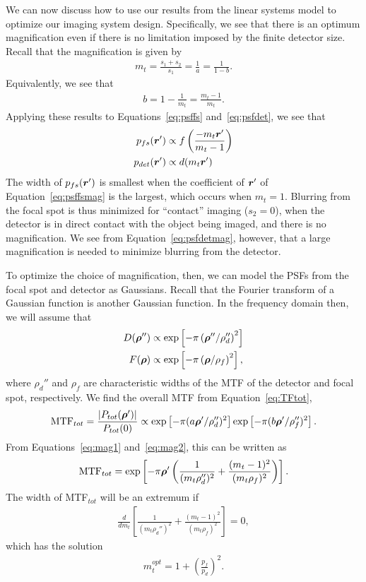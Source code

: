 \documentclass[mphy386-notes.tex]{subfiles}
\begin{document}
We can now discuss how to use our results from the linear systems
model to optimize our imaging system design. Specifically, we see
that there is an optimum magnification even if there is no limitation
imposed by the finite detector size. Recall that the magnification is
given by
\begin{align}
  m_t = \frac{s_1+s_2}{s_1} = \frac{1}{a} = \frac{1}{1-b}.
  \label{eq:mag1}
\end{align}
Equivalently, we see that
\begin{align}
  b = 1 - \frac{1}{m_t} = \frac{m_t - 1}{m_t}.
  \label{eq:mag2}
\end{align}
Applying these results to Equations~\ref{eq:psffs} and~\ref{eq:psfdet},
we see that
\begin{align}
  p_{fs}(\boldsymbol{r}') &\propto f\left(\frac{-m_t\boldsymbol{r}'}{m_t - 1}\right)\label{eq:psffsmag}\\
  p_{det}(\boldsymbol{r}') &\propto d(m_t\boldsymbol{r}')\label{eq:psfdetmag}
\end{align}
The width of $p_{fs}(\boldsymbol{r}')$ is smallest when the coefficient of $\boldsymbol{r}'$ of
Equation~\ref{eq:psffsmag} is the largest, which occurs when $m_t = 1$. Blurring
from the focal spot is thus minimized for ``contact'' imaging ($s_2 = 0$), when
the detector is in direct contact with the object being imaged, and there is no
magnification. We see from Equation~\ref{eq:psfdetmag}, however, that a large
magnification is needed to minimize blurring from the detector.

To optimize the choice of magnification, then, we can model the PSFs from the
focal spot and detector as Gaussians. Recall that the Fourier transform of a
Gaussian function is another Gaussian function. In the frequency domain then, we
will assume that
\begin{align}
  D(\boldsymbol{\rho}'') &\propto \text{exp}\left[-\pi\left(\boldsymbol{\rho}''/\rho_d''\right)^2\right]\\
  F(\boldsymbol{\rho}) &\propto \text{exp}\left[-\pi\left(\boldsymbol{\rho}/\rho_f\right)^2\right],
\end{align}
where $\rho_d''$ and $\rho_f$ are characteristic widths of the MTF of the detector and
focal spot, respectively. We find the overall MTF from Equation~\ref{eq:TFtot},
\begin{align}
  \text{MTF}_{tot} = \frac{|P_{tot}(\boldsymbol{\rho}')|}{P_{tot}(0)} \propto \text{exp}\left[-\pi(a\boldsymbol{\rho}'/\rho_d'')^2\right]\text{exp}\left[-\pi(b\boldsymbol{\rho}'/\rho_f'')^2\right].
\end{align}
From Equations~\ref{eq:mag1} and~\ref{eq:mag2}, this can be written as
\begin{align}
  \text{MTF}_{tot} = \text{exp}\left[-\pi\boldsymbol{\rho}'\left(\frac{1}{(m_t \rho_d'')^2} + \frac{(m_t-1)^2}{(m_t\rho_f)^2}\right)\right].
\end{align}
The width of MTF$_{tot}$ will be an extremum if
\begin{align}
  \frac{d}{d m_t}\left[\frac{1}{(m_t \rho_d'')^2} + \frac{(m_t-1)^2}{(m_t\rho_f)^2}\right] = 0,
\end{align}
which has the solution
 \begin{align}
  m_t^{opt} = 1 + \left(\frac{p_f}{p_d}\right)^2.
  \label{eq:magopt}
\end{align}
\end{document}
